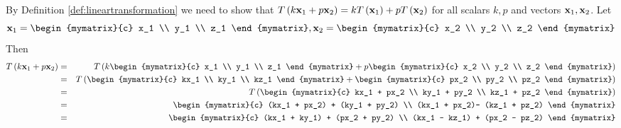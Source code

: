 \begin{solution}
By Definition \ref{def:lineartransformation} we need to show that $T\left( k {\bf x}_1 + p {\bf x}_2 \right) = kT\left({\bf x}_1\right)+ pT\left({\bf x}_{2} \right)$ for all scalars $k,p$ and vectors ${\bf x}_1, {\bf x}_2$.
Let
\[
\vect{x}_1 = \begin{mymatrix}{c} x_1 \\ y_1 \\ z_1 \end{mymatrix}, 
\vect{x}_2 = \begin{mymatrix}{c} x_2 \\ y_2 \\ z_2 \end{mymatrix}
\]
Then
\begin{eqnarray*}
T\left( k \vect{x}_1 + p \vect{x}_2 \right) &=& T \left( k \begin{mymatrix}{c} x_1 \\ y_1 \\ z_1 \end{mymatrix} + p \begin{mymatrix}{c} x_2 \\ y_2 \\ z_2 \end{mymatrix} \right) \\
&=& T \left(  \begin{mymatrix}{c} kx_1 \\ ky_1 \\ kz_1 \end{mymatrix} +  \begin{mymatrix}{c} px_2 \\ py_2 \\ pz_2 \end{mymatrix} \right) \\
&=& T \left(  \begin{mymatrix}{c} kx_1 + px_2 \\ ky_1 + py_2 \\ kz_1 + pz_2 \end{mymatrix}  \right) \\
&=& \begin{mymatrix}{c} (kx_1 + px_2) + (ky_1 + py_2) \\ (kx_1 + px_2)- (kz_1 + pz_2) \end{mymatrix} \\
&=& \begin{mymatrix}{c} (kx_1 + ky_1) + (px_2 + py_2) \\ (kx_1 - kz_1) + (px_2 - pz_2) \end{mymatrix} \\

\end{eqnarray*}
\end{solution}
